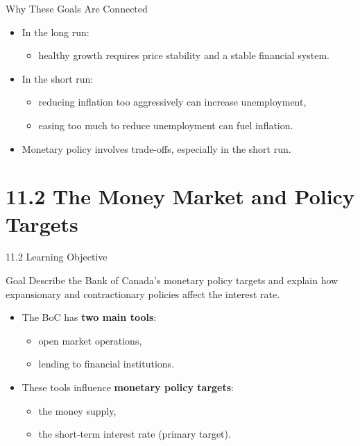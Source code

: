 \documentclass[aspectratio=169]{beamer}
\begin{document}
\begin{frame}{Why These Goals Are Connected}
\transfade
\begin{itemize}
  \item In the long run:
  \begin{itemize}
    \item healthy growth requires price stability and a stable financial system.
  \end{itemize}
  \item In the short run:
  \begin{itemize}
    \item reducing inflation too aggressively can increase unemployment,
    \item easing too much to reduce unemployment can fuel inflation.
  \end{itemize}
  \item Monetary policy involves \alert{trade-offs}, especially in the short run.
\end{itemize}
\end{frame}

\section{11.2 The Money Market and Policy Targets}

\begin{frame}{11.2 Learning Objective}
\transfade
\begin{block}{Goal}
Describe the Bank of Canada’s monetary policy targets and explain how expansionary and contractionary policies affect the interest rate.
\end{block}
\begin{itemize}
  \item The BoC has \textbf{two main tools}:
  \begin{itemize}
    \item open market operations,
    \item lending to financial institutions.
  \end{itemize}
  \item These tools influence \textbf{monetary policy targets}:
  \begin{itemize}
    \item the money supply,
    \item the short-term interest rate (primary target).
  \end{itemize}
\end{itemize}
\end{frame}
\end{document}
